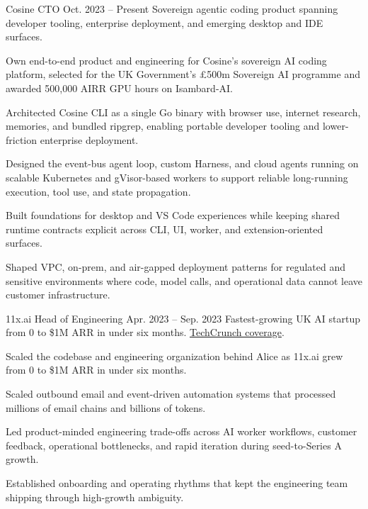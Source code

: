 
\ResumeJob
  {Cosine}
  {CTO}
  {Oct. 2023 -- Present}
  {Sovereign agentic coding product spanning developer tooling, enterprise deployment, and emerging desktop and IDE surfaces.}
\begin{ResumeList}
  \item Own end-to-end product and engineering for Cosine's sovereign AI coding platform, selected for the UK Government's \pounds{}500m Sovereign AI programme and awarded 500,000 AIRR GPU hours on Isambard-AI.
  \item Architected Cosine CLI as a single Go binary with browser use, internet research, memories, and bundled ripgrep, enabling portable developer tooling and lower-friction enterprise deployment.
  \item Designed the event-bus agent loop, custom Harness, and cloud agents running on scalable Kubernetes and gVisor-based workers to support reliable long-running execution, tool use, and state propagation.
  \item Built foundations for desktop and VS Code experiences while keeping shared runtime contracts explicit across CLI, UI, worker, and extension-oriented surfaces.
  \item Shaped VPC, on-prem, and air-gapped deployment patterns for regulated and sensitive environments where code, model calls, and operational data cannot leave customer infrastructure.
\end{ResumeList}

\ResumeJob
  {11x.ai}
  {Head of Engineering}
  {Apr. 2023 -- Sep. 2023}
  {Fastest-growing UK AI startup from 0 to \$1M ARR in under six months. \href{https://techcrunch.com/2023/08/11/11xai-closes-2-million-pre-seed-to-create-autonomous-ai-workers/}{TechCrunch coverage}.}
\begin{ResumeList}
  \item Scaled the codebase and engineering organization behind Alice as 11x.ai grew from 0 to \$1M ARR in under six months.
  \item Scaled outbound email and event-driven automation systems that processed millions of email chains and billions of tokens.
  \item Led product-minded engineering trade-offs across AI worker workflows, customer feedback, operational bottlenecks, and rapid iteration during seed-to-Series A growth.
  \item Established onboarding and operating rhythms that kept the engineering team shipping through high-growth ambiguity.
\end{ResumeList}

